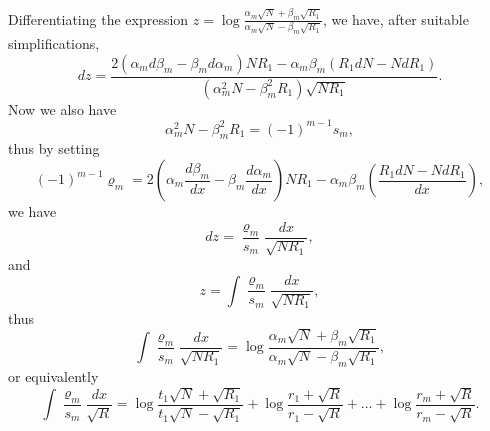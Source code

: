 \documentclass[oneside, 12 pt, leqno]{memoir}
\begin{document}
Differentiating the expression \(z=\log \frac{\alpha_m \sqrt{N}+\beta_m \sqrt{R_1}}{\alpha_m \sqrt{N}-\beta_m \sqrt{R_1}}\), we have, after suitable simplifications,
\[d z=\frac{2\left(\alpha_m d \beta_m-\beta_m d \alpha_m\right) N R_1-\alpha_m \beta_m\left(R_1 d N-N d R_1\right)}{\left(\alpha_m^2 N-\beta_m^2 R_1\right) \sqrt{N R_1}}.\]
Now we also have
\[\alpha_m^2 N-\beta_m^2 R_1=(-1)^{m-1} s_m,\]
thus by setting
\[\tag{27}(-1)^{m-1} \varrho_m=2\left(\alpha_m \frac{d \beta_m}{d x}-\beta_m \frac{d \alpha_m}{d x}\right) N R_1-\alpha_m \beta_m\left(\frac{R_1 d N-N d R_1}{d x}\right),\]
we have
\[d z=\frac{\varrho_m}{s_m} \frac{d x}{\sqrt{N R_1}},\]
and
\[z=\int \frac{\varrho_m}{s_m} \frac{d x}{\sqrt{ N R_1}},\]
thus
\[\int \frac{\varrho_m}{s_m} \frac{d x}{\sqrt{N R_1}}=\log \frac{\alpha_m \sqrt{N}+\beta_m \sqrt{R_1}}{\alpha_m \sqrt{N}-\beta_m \sqrt{ R_1}},\]
or equivalently
\[\tag{28}\int \frac{\varrho_m}{s_m} \frac{d x}{\sqrt{R}}=\log \frac{t_1 \sqrt{N}+\sqrt{R_1}}{t_1 \sqrt{N}-\sqrt{R_1}}+\log \frac{r_1+\sqrt{R}}{r_1-\sqrt{ R}}+\dots+\log \frac{r_m+\sqrt{R}}{r_m-\sqrt{ R}}.\]
\end{document}
